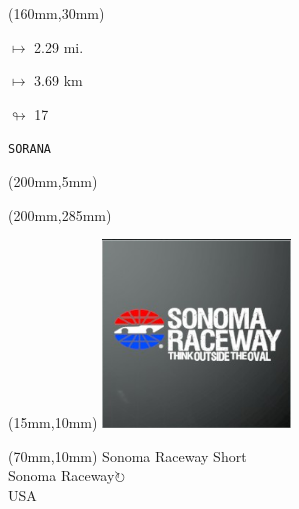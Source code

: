 \begin{textblock*}{40mm}(160mm,30mm)%
\Large
\par$\mapsto$ 2.29 mi.
\par$\mapsto$ 3.69 km
\par$\looparrowright$ 17
\par\hfill\tiny\tt SORANA\\
\end{textblock*}
\begin{textblock*}{20mm}(200mm,5mm)%
\fbox{\thepage}
\label{SORANA}
\end{textblock*}
\begin{textblock*}{20mm}(200mm,285mm)%
\fbox{\thepage}
\end{textblock*}

\null\newpage
\begin{textblock*}{50mm}(15mm,10mm)%
\includegraphics[width=50mm]{LG/2015-05-20_00096.png}
\end{textblock*}
\begin{textblock*}{130mm}(70mm,10mm)%
{\fontsize{20}{20}\selectfont Sonoma Raceway Short\\}
{\fontsize{16}{16}\selectfont Sonoma Raceway\hfill \Large$\circlearrowright$\\}
{\fontsize{12}{12}\selectfont USA\\}
\end{textblock*}
